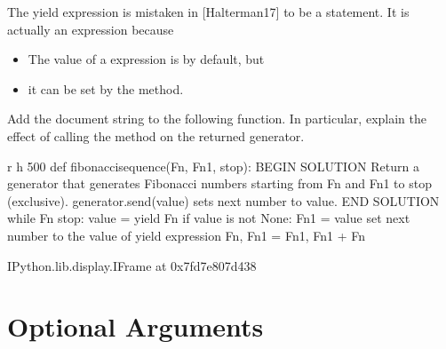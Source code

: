 \documentclass[letterpaper,10pt,english]{sphinxmanual}
\begin{document}
 The yield expression  is mistaken in {[}Halterman17{]} to be a statement. It is actually an expression because
\begin{itemize}
\item {} 
The value of a  expression is  by default, but

\item {} 
it can be set by the  method.

\end{itemize}

Add the document string to the following function. In particular, explain the effect of calling the method  on the returned generator.

\begin{sphinxVerbatim}[commandchars=\\\{\}]
 \PYGZhy{}r \PYGZhy{}h 500
def fibonacci\PYGZus{}sequence(Fn, Fn1, stop):
    \PYGZsh{}\PYGZsh{}\PYGZsh{} BEGIN SOLUTION
    \PYGZsq{}\PYGZsq{}\PYGZsq{}Return a generator that generates Fibonacci numbers
    starting from Fn and Fn1 to stop (exclusive). 
    generator.send(value) sets next number to value.\PYGZsq{}\PYGZsq{}\PYGZsq{}
    \PYGZsh{}\PYGZsh{}\PYGZsh{} END SOLUTION
    while Fn \PYGZlt{} stop:
        value = yield Fn
        if value is not None: 
            Fn1 = value  \PYGZsh{} set next number to the value of yield expression
        Fn, Fn1 = Fn1, Fn1 + Fn 
\end{sphinxVerbatim}

\begin{sphinxVerbatim}[commandchars=\\\{\}]
\PYGZlt{}IPython.lib.display.IFrame at 0x7fd7e807d438\PYGZgt{}
\end{sphinxVerbatim}


\section{Optional Arguments}
\label{\detokenize{Lecture6/More on Functions:optional-arguments}}

\begin{sphinxVerbatim}[commandchars=\\\{\}]
   
           
           
              
\end{sphinxVerbatim}
\end{document}
